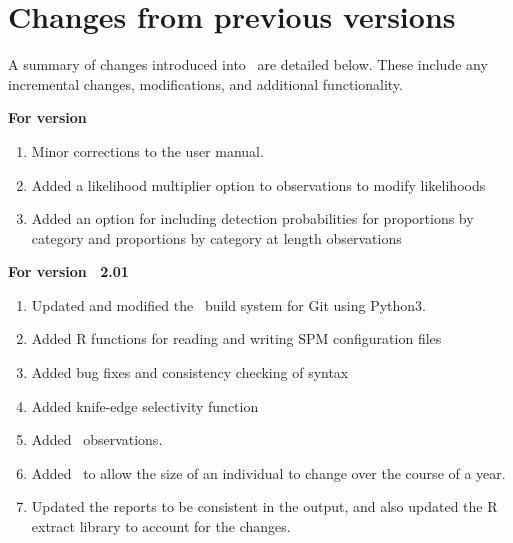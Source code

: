 \section{Changes from previous versions}

A summary of changes introduced into \SPM\ are detailed below. These include any incremental changes, modifications, and additional functionality.

\textbf{For version \SPM\ \VER}

\begin{enumerate}
  \item Minor corrections to the user manual.
	\item Added a likelihood multiplier option to observations to modify likelihoods
	\item Added an option for including detection probabilities for proportions by category and proportions by category at length observations
\end{enumerate}

\textbf{For version \SPM\ 2.01}

\begin{enumerate}
  \item Updated and modified the \SPM\ build system for Git using Python3.
  \item Added R functions for reading and writing SPM configuration files
	\item Added bug fixes and consistency checking of syntax
	\item Added knife-edge selectivity function
  \item Added\   observations.
  \item Added\   to allow the size of an individual to change over the course of a year.	
  \item Updated the reports to be consistent in the output, and also updated the R extract library to account for the changes.
\end{enumerate}


